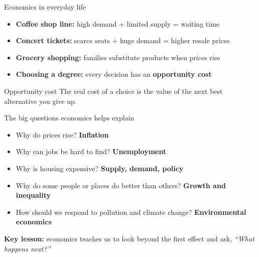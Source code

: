 \documentclass[aspectratio=169,11pt]{beamer}
\begin{document}
\begin{frame}{Economics in everyday life}
\begin{itemize}
    \item \textbf{Coffee shop line:} high demand + limited supply = waiting time
    \item \textbf{Concert tickets:} scarce seats + huge demand = higher resale prices
    \item \textbf{Grocery shopping:} families substitute products when prices rise
    \item \textbf{Choosing a degree:} every decision has an \textbf{opportunity cost}
\end{itemize}
\vspace{0.4cm}
\begin{block}{Opportunity cost}
The real cost of a choice is the value of the next best alternative you give up.
\end{block}
\vspace{0.2cm}
\end{frame}

\begin{frame}{The big questions economics helps explain}
\begin{itemize}
    \item Why do prices rise? \hfill \textbf{Inflation}
    \item Why can jobs be hard to find? \hfill \textbf{Unemployment}
    \item Why is housing expensive? \hfill \textbf{Supply, demand, policy}
    \item Why do some people or places do better than others? \hfill \textbf{Growth and inequality}
    \item How should we respond to pollution and climate change? \hfill \textbf{Environmental economics}
\end{itemize}
\vspace{0.5cm}
\textbf{Key lesson:} economics teaches us to look beyond the first effect and ask,\newline
\textit{``What happens next?''}
\end{frame}
\end{document}
